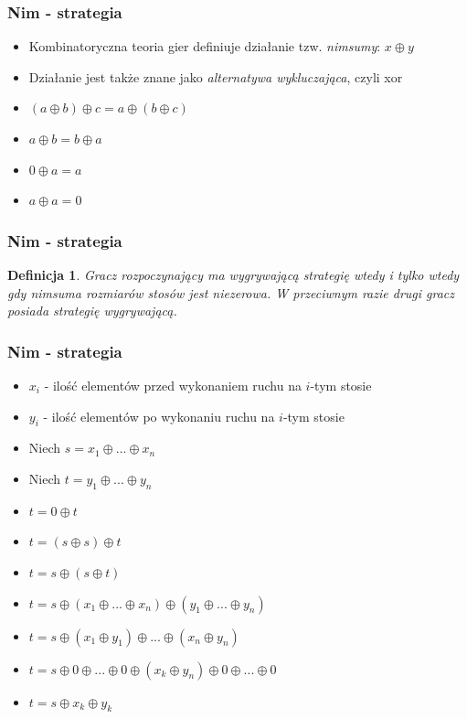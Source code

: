\documentclass[polish,envcountsect,10pt]{beamer}
\newtheorem{mdfn}{Definicja}
\begin{document}
                \begin{frame}
                    \frametitle{Nim - strategia}
                        \begin{itemize}
                            \item<1->Kombinatoryczna teoria gier definiuje działanie tzw. \textit{nimsumy}: $x \oplus y$
                            \item<2-> Działanie jest także znane jako \textit{alternatywa wykluczająca}, czyli xor
                            \item<3-> $(a \oplus b) \oplus c = a \oplus (b \oplus c)$
                            \item<4-> $a \oplus b = b \oplus a$
                            \item<5-> $0 \oplus a = a$
                            \item<6-> $a \oplus a = 0$
                        \end{itemize}
                \end{frame}
                \begin{frame}
                    \frametitle{Nim - strategia}
                        \begin{mdfn}
                            Gracz rozpoczynający ma wygrywającą strategię wtedy i tylko wtedy gdy nimsuma rozmiarów stosów jest niezerowa. W przeciwnym razie drugi gracz posiada strategię wygrywającą.
                        \end{mdfn} 
                \end{frame}
                \begin{frame}
                    \frametitle{Nim - strategia}
                        \begin{itemize}
                            \item<1-> $x_i$ - ilość elementów przed wykonaniem ruchu na $i$-tym stosie
                            \item<2-> $y_i$ - ilość elementów po wykonaniu ruchu na $i$-tym stosie
                            \item<3-> Niech $s = x_1 \oplus ... \oplus x_n$
                            \item<4-> Niech $t = y_1 \oplus ... \oplus y_n$
                            \item<5-> $t = 0 \oplus t $ 
                            \item<6-> $t = (s \oplus s) \oplus t$
                            \item<7-> $t = s \oplus (s \oplus t)$
                            \item<8-> $t = s \oplus (x_1 \oplus ... \oplus x_n) \oplus (y_1 \oplus ... \oplus y_n)$
                            \item<9-> $t = s \oplus (x_1 \oplus y_1) \oplus ... \oplus (x_n \oplus y_n) $
                            \item<10-> $t = s \oplus 0 \oplus ... \oplus 0 \oplus (x_k \oplus y_n) \oplus 0 \oplus ... \oplus 0$
                            \item<11-> $t = s \oplus x_k \oplus y_k$
                        \end{itemize}
                \end{frame}
\end{document}
